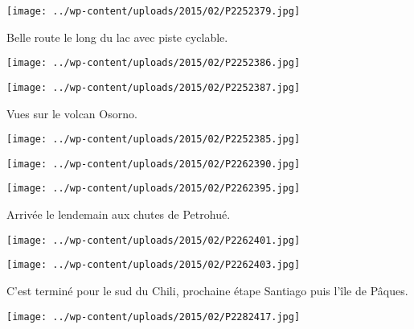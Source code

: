  \newline
\centerline{\texttt{[image: ../wp-content/uploads/2015/02/P2252379.jpg]} } 
 \newline
 Belle route le long du lac avec piste cyclable. \newline
 \newline
\centerline{\texttt{[image: ../wp-content/uploads/2015/02/P2252386.jpg]} } 
 \newline
\centerline{\texttt{[image: ../wp-content/uploads/2015/02/P2252387.jpg]} } 
 \newline
 Vues sur le volcan Osorno. \newline
 \newline
\centerline{\texttt{[image: ../wp-content/uploads/2015/02/P2252385.jpg]} } 
 \newline
 \newline
\centerline{\texttt{[image: ../wp-content/uploads/2015/02/P2262390.jpg]} } 
 \newline
\centerline{\texttt{[image: ../wp-content/uploads/2015/02/P2262395.jpg]} } 
Arrivée le lendemain aux chutes de Petrohué. \newline
 \newline
\centerline{\texttt{[image: ../wp-content/uploads/2015/02/P2262401.jpg]} } 
 \newline
\centerline{\texttt{[image: ../wp-content/uploads/2015/02/P2262403.jpg]} } 
 \newline
 C'est terminé pour le sud du Chili, prochaine étape Santiago puis l'île de Pâques. \newline
 \newline
\centerline{\texttt{[image: ../wp-content/uploads/2015/02/P2282417.jpg]} } 
 \newline
  \newline
  \newline
  \newline
  \newline
  \newline
  \newline
  \newline
  \newline
  \newline
  \newline
  \newline
  \newline
  \newline
  \newline
  \newline

\newpage
 
